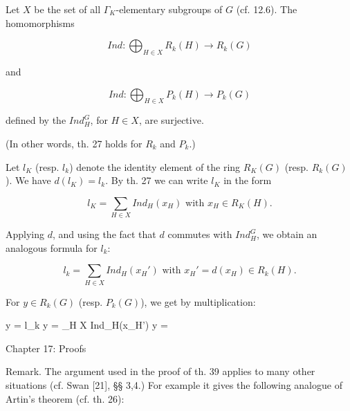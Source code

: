 Let $X$ be the set of all $\Gamma_K$-elementary subgroups of $G$ (cf. 12.6). The homomorphisms

$$Ind: \bigoplus_{H \in X} R_k(H) \rightarrow R_k(G)$$

and

$$Ind: \bigoplus_{H \in X} P_k(H) \rightarrow P_k(G)$$

defined by the $Ind_H^G$, for $H \in X$, are surjective.

(In other words, th. 27 holds for $R_k$ and $P_k$.)

Let $l_K$ (resp. $l_k$) denote the identity element of the ring $R_K(G)$ (resp. $R_k(G)$). We have $d(l_K) = l_k$. By th. 27 we can write $l_K$ in the form

$$l_K = \sum_{H \in X} Ind_H(x_H) \text{ with } x_H \in R_K(H).$$

Applying $d$, and using the fact that $d$ commutes with $Ind_H^G$, we obtain an analogous formula for $l_k$:

$$l_k = \sum_{H \in X} Ind_H(x_H') \text{ with } x_H' = d(x_H) \in R_k(H).$$

For $y \in R_k(G)$ (resp. $P_k(G)$), we get by multiplication:

$$y = l_k \cdot y = \sum_{H \in X} Ind_H(x_H') \cdot y =

Chapter 17: Proofs

Remark. The argument used in the proof of th. 39 applies to many other situations (cf. Swan [21], §§ 3,4.) For example it gives the following analogue of Artin’s theorem (cf. th. 26):
